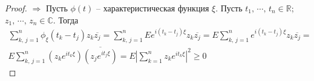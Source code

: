 \begin{proof}
  $\Rightarrow$ Пусть $\phi(t)$ -- характеристическая функция $\xi$. Пусть $t_1,\,\cdots,\,t_n \in \mathbb{R}$; $z_1,\,\cdots,\,z_n \in \mathbb{C}$. Тогда
  \begin{align*}
    \sum_{k,\,j = 1}^n \phi_\xi(t_k - t_j)z_k\overline{z_j} = \sum_{k,\, j = 1}^n Ee^{i(t_k - t_j)\xi}z_k\overline{z_j} = E\sum_{k,\, j = 1}^n e^{i(t_k - t_j)\xi}z_k\overline{z_j} = \\
    E\sum_{k,\, j = 1}^n (z_ke^{it_k\xi})\overline{(z_je^{it_j\xi})} = E\left|\sum_{k = 1}^n z_ke^{it_k\xi}\right|^2 \geq 0 
  \end{align*}
\end{proof}
